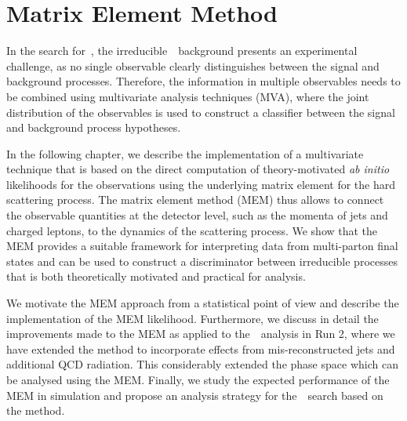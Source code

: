 \chapter{Matrix Element Method}
\label{sec:mem}
In the search for~\ttHbb, the irreducible~\ttbb~background presents an experimental challenge, as no single observable clearly distinguishes between the signal and background processes. Therefore, the information in multiple observables needs to be combined using multivariate analysis techniques (MVA), where the joint distribution of the observables is used to construct a classifier between the signal and background process hypotheses.

In the following chapter, we describe the implementation of a multivariate technique that is based on the direct computation of theory-motivated \textit{ab initio} likelihoods for the observations using the underlying matrix element for the hard scattering process. The matrix element method (MEM) thus allows to connect the observable quantities at the detector level, such as the momenta of jets and charged leptons, to the dynamics of the scattering process. We show that the MEM provides a suitable framework for interpreting data from multi-parton final states and can be used to construct a discriminator between irreducible processes that is both theoretically motivated and practical for analysis.

We motivate the MEM approach from a statistical point of view and describe the implementation of the MEM likelihood. Furthermore, we discuss in detail the improvements made to the MEM as applied to the~\ttHbb~analysis in Run 2, where we have extended the method to incorporate effects from mis-reconstructed jets and additional QCD radiation. This considerably extended the phase space which can be analysed using the MEM. Finally, we study the expected performance of the MEM in simulation and propose an analysis strategy for the~\ttHbb~search based on the method.

